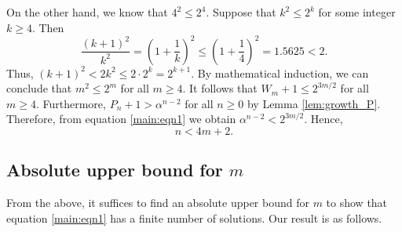 \documentclass[11pt,a4paper]{article}
\numberwithin{equation}{section}
\numberwithin{table}{section}
\numberwithin{figure}{section}
\begin{document}
On the other hand, we know that $4^{2}\le 2^{4}$. Suppose that $k^{2}\le 2^{k}$ for some integer $k\ge 4$. Then
$$
\frac{(k+1)^{2}}{k^{2}}=\left(1+\frac{1}{k}\right)^{2}\le \left(1+\frac{1}{4}\right)^{2}=1.5625<2.
$$
Thus, $(k+1)^{2}<2k^{2}\le 2\cdot 2^{k}=2^{k+1}$. By mathematical induction, we can conclude that $m^{2}\le 2^{m}$ for all $m\ge 4$. It follows that $W_{m}+1\le 2^{3m/2}$ for all $m\ge 4$. Furthermore, $P_{n}+1>\alpha^{n-2}$ for all $n\ge 0$ by Lemma \ref{lem:growth_P}. Therefore, from equation \eqref{main:eqn1} we obtain $\alpha^{n-2}<2^{3m/2}$. Hence,
\begin{equation}\label{E6}
n<4m+2.
\end{equation}

\subsection{Absolute upper bound for $m$}
From the above, it suffices to find an absolute upper bound for $m$ to show that equation \eqref{main:eqn1} has a finite number of solutions. Our result is as follows.
\end{document}
